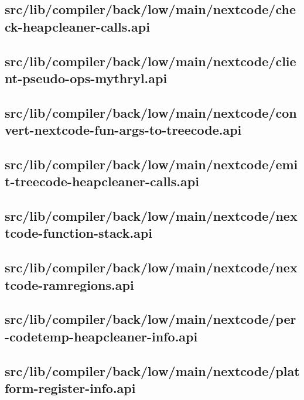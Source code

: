 \subsection{src/lib/compiler/back/low/main/nextcode/check-heapcleaner-calls.api}


\subsection{src/lib/compiler/back/low/main/nextcode/client-pseudo-ops-mythryl.api}


\subsection{src/lib/compiler/back/low/main/nextcode/convert-nextcode-fun-args-to-treecode.api}


\subsection{src/lib/compiler/back/low/main/nextcode/emit-treecode-heapcleaner-calls.api}


\subsection{src/lib/compiler/back/low/main/nextcode/nextcode-function-stack.api}


\subsection{src/lib/compiler/back/low/main/nextcode/nextcode-ramregions.api}


\subsection{src/lib/compiler/back/low/main/nextcode/per-codetemp-heapcleaner-info.api}


\subsection{src/lib/compiler/back/low/main/nextcode/platform-register-info.api}


